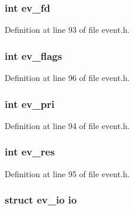 \hypertarget{structevent_a7016497f14046277c71be6d4c1620890}{
\subsubsection[{ev\-\_\-fd}]{\setlength{\rightskip}{0pt plus 5cm}int {\bf ev\-\_\-fd}}}\label{structevent_a7016497f14046277c71be6d4c1620890}


\-Definition at line 93 of file event.\-h.

\hypertarget{structevent_a7facfe0f28541f092cd123c21e89c6c4}{
\subsubsection[{ev\-\_\-flags}]{\setlength{\rightskip}{0pt plus 5cm}int {\bf ev\-\_\-flags}}}\label{structevent_a7facfe0f28541f092cd123c21e89c6c4}


\-Definition at line 96 of file event.\-h.

\hypertarget{structevent_afc1b09b76d937eb994d6cdd3adf9ffcc}{
\subsubsection[{ev\-\_\-pri}]{\setlength{\rightskip}{0pt plus 5cm}int {\bf ev\-\_\-pri}}}\label{structevent_afc1b09b76d937eb994d6cdd3adf9ffcc}


\-Definition at line 94 of file event.\-h.

\hypertarget{structevent_acea2638a9075ad5d22ee179fda2fb8bc}{
\subsubsection[{ev\-\_\-res}]{\setlength{\rightskip}{0pt plus 5cm}int {\bf ev\-\_\-res}}}\label{structevent_acea2638a9075ad5d22ee179fda2fb8bc}


\-Definition at line 95 of file event.\-h.

\hypertarget{structevent_a8a4fa321488e67a96ad783dc24187c4c}{
\subsubsection[{io}]{\setlength{\rightskip}{0pt plus 5cm}struct {\bf ev\-\_\-io} {\bf io}}}\label{structevent_a8a4fa321488e67a96ad783dc24187c4c}


